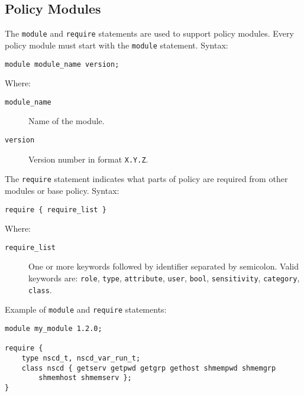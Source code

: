 \subsection{Policy Modules}

The \texttt{module} and \texttt{require} statements are used to support policy
modules. Every policy module must start with the \texttt{module} statement.
Syntax:
\begin{lstlisting}
module module_name version;
\end{lstlisting}
Where:
\begin{description}
    \item [\texttt{module\_name}] Name of the module.
    \item [\texttt{version}] Version number in format \texttt{X.Y.Z}.
\end{description}

The \texttt{require} statement indicates what parts of policy are required from
other modules or base policy. Syntax:
\begin{lstlisting}
require { require_list }
\end{lstlisting}
Where:
\begin{description}
    \item [\texttt{require\_list}] One or more keywords followed by identifier
        separated by semicolon. Valid keywords are: \texttt{role},
        \texttt{type}, \texttt{attribute}, \texttt{user}, \texttt{bool},
        \texttt{sensitivity}, \texttt{category}, \texttt{class}.
\end{description}

Example of \texttt{module} and \texttt{require} statements:
\begin{lstlisting}
module my_module 1.2.0;

require {
    type nscd_t, nscd_var_run_t;
    class nscd { getserv getpwd getgrp gethost shmempwd shmemgrp
        shmemhost shmemserv };
}
\end{lstlisting}

